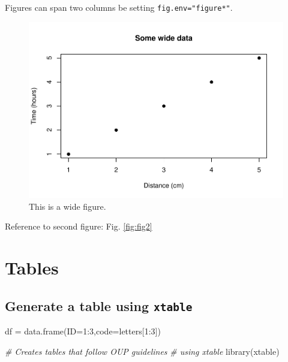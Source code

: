 \documentclass[webpdf,large,contemporary,namedate]{oup-authoring-template}
\newenvironment{Shaded}{\begin{snugshade}}{\end{snugshade}}
\newcommand{\AttributeTok}[1]{\textcolor[rgb]{0.77,0.63,0.00}{#1}}
\newcommand{\CommentTok}[1]{\textcolor[rgb]{0.56,0.35,0.01}{\textit{#1}}}
\newcommand{\DecValTok}[1]{\textcolor[rgb]{0.00,0.00,0.81}{#1}}
\newcommand{\FunctionTok}[1]{\textcolor[rgb]{0.00,0.00,0.00}{#1}}
\newcommand{\NormalTok}[1]{#1}
\newcommand{\OtherTok}[1]{\textcolor[rgb]{0.56,0.35,0.01}{#1}}
\newcommand{\SpecialCharTok}[1]{\textcolor[rgb]{0.00,0.00,0.00}{#1}}
\theoremstyle{thmstyleone}
\theoremstyle{thmstyletwo}
\theoremstyle{thmstylethree}
\begin{document}
Figures can span two columns be setting \texttt{fig.env="figure*"}.

\begin{figure}[th]
\includegraphics[width=1\linewidth]{x_files/figure-latex/figb-1} \caption{This is a wide figure.}\label{fig:figb}
\end{figure}

Reference to second figure: Fig. \ref{fig:fig2}

\hypertarget{tables}{%
\section{Tables}\label{tables}}

\hypertarget{generate-a-table-using-xtable}{%
\subsection{\texorpdfstring{Generate a table using
\texttt{xtable}}{Generate a table using xtable}}\label{generate-a-table-using-xtable}}

\begin{Shaded}
\begin{Highlighting}[]
\NormalTok{df }\OtherTok{=} \FunctionTok{data.frame}\NormalTok{(}\AttributeTok{ID=}\DecValTok{1}\SpecialCharTok{:}\DecValTok{3}\NormalTok{,}\AttributeTok{code=}\NormalTok{letters[}\DecValTok{1}\SpecialCharTok{:}\DecValTok{3}\NormalTok{])}

\CommentTok{\# Creates tables that follow OUP guidelines }
\CommentTok{\# using xtable}
\FunctionTok{library}\NormalTok{(xtable) }
\end{Highlighting}
\end{Shaded}
\end{document}
